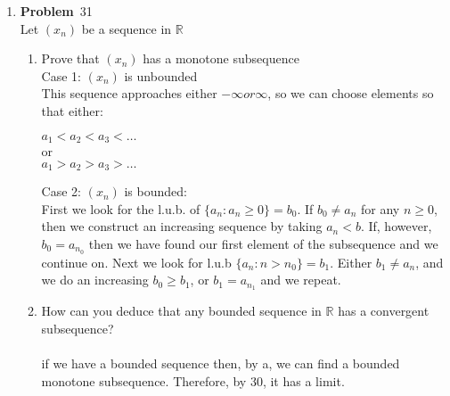 \documentclass[12pt]{amsart}
\newcommand{\benu}{\begin{enumerate}}
\newcommand{\eenu}{\end{enumerate}}
\theoremstyle{definition}
\newcommand{\mbR}{\mathbb{R}}
\newcommand{\itep}{\item {\bfseries Problem}\ }
\begin{document}
\begin{enumerate}[series=p]
\newpage

\itep 31\\
Let $(x_n)$ be a sequence in $\mbR$
\benu
\item Prove that $(x_n)$ has a monotone subsequence\\
Case 1: $(x_n)$ is unbounded\\
This sequence approaches either $-\infty or \infty$, so we can choose elements so that either:
\begin{center}
	$a_1 < a_2 < a_3 < \dots$
	\\
	or
	\\
	$a_1 > a_2 > a_3 > \dots$
\end{center}
Case 2: $(x_n)$ is bounded:\\
First we look for the l.u.b. of $\{a_n: a_n \geq 0\} = b_0$.  If $b_0 \neq a_n$ for any $n \geq 0$, then we construct an increasing sequence by taking $a_n < b$.  If, however, $b_0 = a_{n_0}$ then we have found our first element of the subsequence and we continue on.  Next we look for l.u.b $\{a_n: n>n_0\} = b_1$.  Either $b_1 \neq a_n$, and we do an increasing $b_0 \geq b_1$, or $b_1 = a_{n_1}$ and we repeat.
\item How can you deduce that any bounded sequence in $\mbR$ has a convergent subsequence?
\\\\
if we have a bounded sequence then, by a, we can find a bounded monotone subsequence.  Therefore, by 30, it has a limit.
\eenu

\end{enumerate}
\end{document}
